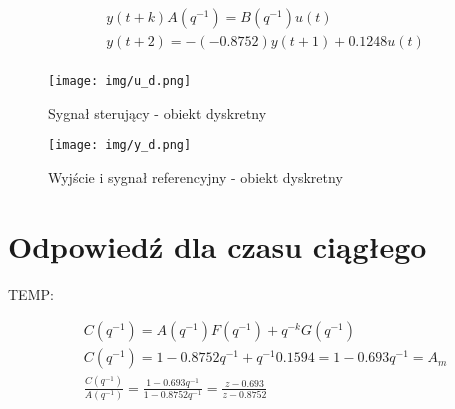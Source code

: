 \documentclass[fleqn]{article}
\newcommand \A {1 - 0.8752 q^{-1}}
\newcommand \B {0.1248}
\newcommand \Am {1 - 0.693 q^{-1}}
\newcommand \aOne {-0.8752}
\newcommand \amOne {-0.693}
\newcommand \G {0.1594}
\begin{document}
\begin{equation}\label{eq:output}
\begin{split}
& y(t+k) A(q^{-1}) = B(q^{-1}) u(t) \\
& y(t+2) = -(\aOne) y(t+1) + \B u(t) \\
\end{split}
\end{equation}

\begin{figure}[H]
    \centering
    \texttt{[image: img/u\_d.png]}
    \caption{Sygnał sterujący - obiekt dyskretny}
    \label{fig:u_d}
\end{figure}

\begin{figure}[H]
    \centering
    \texttt{[image: img/y\_d.png]}
    \caption{Wyjście i sygnał referencyjny - obiekt dyskretny}
    \label{fig:y_d}
\end{figure}

\section{Odpowiedź dla czasu ciągłego}
TEMP:

\begin{equation}\label{eq:C}
\begin{split}
& C(q^{-1}) = A(q^{-1})F(q^{-1}) + q^{-k}G(q^{-1})  \\
& C(q^{-1}) = \A + q^{-1} \G = 1 - 0.693 q^{-1} = A_m  \\
& \frac{C(q^{-1})}{A(q^{-1})} = \frac{\Am}{\A}  = \frac{z \amOne}{z \aOne}\\
\end{split}
\end{equation}
\end{document}
